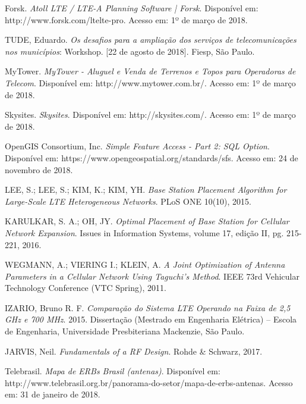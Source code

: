 \documentclass[]{politex}
\begin{document}
\begin{thebibliography}{9}

    Forsk.
    \textit{Atoll LTE / LTE-A Planning Software | Forsk}.
    Disponível em: http://www.forsk.com/ltelte-pro.
    Acesso em: 1º de março de 2018.

    TUDE, Eduardo.
    \textit{Os desafios para a ampliação dos serviços de telecomunicações nos
    municípios}: Workshop.
    [22 de agosto de 2018].
    Fiesp, São Paulo.

    MyTower.
    \textit{MyTower - Aluguel e Venda de Terrenos e Topos para
    Operadoras de Telecom}.
    Disponível em: http://www.mytower.com.br/.
    Acesso em: 1º de março de 2018.

    Skysites.
    \textit{Skysites}.
    Disponível em: http://skysites.com/.
    Acesso em: 1º de março de 2018.

    OpenGIS Consortium, Inc.
    \textit{Simple Feature Access - Part 2: SQL Option}.
    Disponível em: https://www.opengeospatial.org/standards/sfs.
    Acesso em: 24 de novembro de 2018.

    LEE, S.; LEE, S.; KIM, K.; KIM, YH.
    \textit{Base Station Placement Algorithm for Large-Scale LTE
    Heterogeneous Networks}.
    PLoS ONE 10(10), 2015.

    KARULKAR, S. A.; OH, JY.
    \textit{Optimal Placement of Base Station for Cellular Network Expansion}.
    Issues in Information Systems, volume 17, edição II, pg. 215-221, 2016.

    WEGMANN, A.; VIERING I.; KLEIN, A.
    \textit{A Joint Optimization of Antenna Parameters in a
    Cellular Network Using Taguchi’s Method}.
    IEEE 73rd Vehicular Technology Conference (VTC Spring), 2011.

    IZARIO, Bruno R. F.
    \textit{Comparação do Sistema LTE Operando na Faixa de 2,5 GHz e 700 MHz}.
    2015. Dissertação (Mestrado em Engenharia Elétrica) -- Escola de Engenharia,
    Universidade Presbiteriana Mackenzie, São Paulo.

    JARVIS, Neil.
    \textit{Fundamentals of a RF Design}.
    Rohde \& Schwarz, 2017.

    Telebrasil.
    \textit{Mapa de ERBs Brasil (antenas)}.
    Disponível em:
    http://www.telebrasil.org.br/panorama-do-setor/mapa-de-erbs-antenas.
    Acesso em: 31 de janeiro de 2018.


\end{thebibliography}
\end{document}
